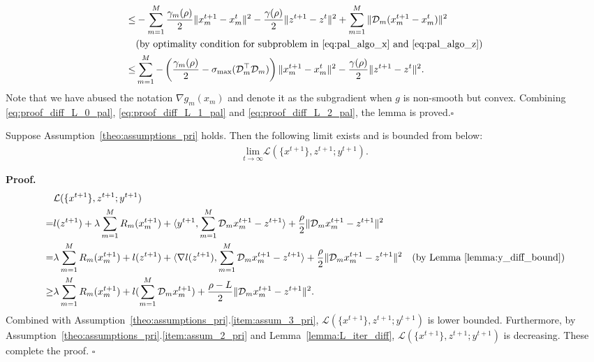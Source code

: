 \begin{align}
    \le & -\sum_{m=1}^{M}\frac{\gamma_m(\rho)}{2}\|x_m^{t+1}-x_m^t\|^2 - \frac{\gamma(\rho)}{2}\|z^{t+1} - z^t\|^2+\sum_{m=1}^{M}\|\mathcal{D}_m(x_m^{t+1} - x_m^t)\|^2\nonumber\\
    & \text{(by optimality condition for subproblem in \eqref{eq:pal_algo_x} and \eqref{eq:pal_algo_z})}\nonumber\\
    \le & \sum_{m=1}^{M} -\left(\frac{\gamma_m(\rho)}{2}-\sigma_{\text{max}}(\mathcal{D}_m^\top \mathcal{D}_m)\right)\|x_m^{t+1} - x_m^t\|^2 - \frac{\gamma(\rho)}{2}\|z^{t+1} - z^t\|^2.\label{eq:proof_diff_L_2_pal}
\end{align}
Note that we have abused the notation $\nabla g_m(x_m)$ and denote it as the subgradient when $g$ is non-smooth but convex.
Combining \eqref{eq:proof_diff_L_0_pal}, \eqref{eq:proof_diff_L_1_pal} and \eqref{eq:proof_diff_L_2_pal}, the lemma is proved.\hfill$\square$

\begin{lemma}\label{lemma:L_lower_bound}
    Suppose Assumption~\ref{theo:assumptions_pri} holds. Then the following limit exists and is bounded from below:
    \begin{align}
        \underset{t\rightarrow\infty}{\text{lim}} \mathcal{L}(\{x^{t+1}\}, z^{t+1}; y^{t+1}).
    \end{align}
\end{lemma}
{\bf Proof.}
\begin{align}
    & \mathcal{L}(\{x^{t+1}\}, z^{t+1}; y^{t+1} )\nonumber\\
    = & l(z^{t+1}) + \lambda\sum_{m=1}^{M} R_m(x_m^{t+1}) + \langle y^{t+1}, \sum_{m=1}^{M}\mathcal{D}_m x_m^{t+1} - z^{t+1}\rangle + \frac{\rho}{2}\|\mathcal{D}_m x_m^{t+1} - z^{t+1}\|^2\nonumber\\
    = &\lambda\sum_{m=1}^{M} R_m(x_m^{t+1}) + l(z^{t+1}) + \langle \nabla l(z^{t+1}), \sum_{m=1}^{M}\mathcal{D}_m x_m^{t+1} - z^{t+1}\rangle + \frac{\rho}{2}\|\mathcal{D}_m x_m^{t+1} - z^{t+1}\|^2\quad\text{(by Lemma~\ref{lemma:y_diff_bound})}\nonumber\\
    \ge & \lambda\sum_{m=1}^{M} R_m(x_m^{t+1}) + l(\sum_{m=1}^{M}\mathcal{D}_m x_m^{t+1}) + \frac{\rho-L}{2}\|\mathcal{D}_m x_m^{t+1} - z^{t+1}\|^2.\quad%
\end{align}
Combined with Assumption~\ref{theo:assumptions_pri}.\ref{item:assum_3_pri}, $\mathcal{L}(\{x^{t+1}\}, z^{t+1}; y^{t+1})$ is lower bounded. Furthermore, by Assumption~\ref{theo:assumptions_pri}.\ref{item:assum_2_pri} and Lemma~\ref{lemma:L_iter_diff}, $\mathcal{L}(\{x^{t+1}\}, z^{t+1}; y^{t+1})$ is decreasing. These complete the proof. \hfill$\square$

